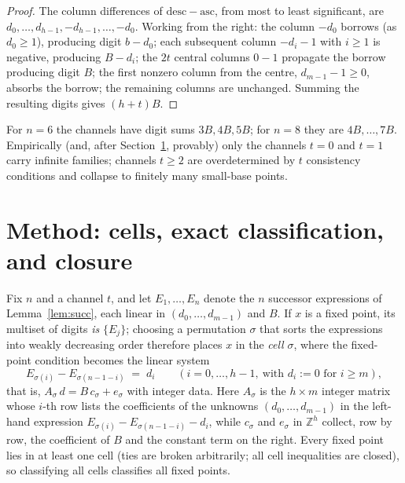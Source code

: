 \documentclass[11pt]{amsart}
\theoremstyle{definition}
\begin{document}
\begin{proof}
The column differences of $\mathrm{desc}-\mathrm{asc}$, from most to
least significant, are $d_0,\dots,d_{h-1},-d_{h-1},\dots,-d_0$. Working
from the right: the column $-d_0$ borrows (as $d_0\ge 1$), producing
digit $b-d_0$; each subsequent column $-d_i-1$ with $i\ge1$ is negative,
producing $B-d_i$; the $2t$ central columns $0-1$ propagate the borrow
producing digit $B$; the first nonzero column from the centre,
$d_{m-1}-1\ge 0$, absorbs the borrow; the remaining columns are
unchanged. Summing the resulting digits gives $(h+t)B$.
\end{proof}

For $n=6$ the channels have digit sums $3B,4B,5B$; for $n=8$ they are
$4B,\dots,7B$. Empirically (and, after Section~\ref{sec:method},
provably) only the channels $t=0$ and $t=1$ carry infinite families;
channels $t\ge 2$ are overdetermined by $t$ consistency conditions and
collapse to finitely many small-base points.

\section{Method: cells, exact classification, and closure}\label{sec:method}

Fix $n$ and a channel $t$, and let $E_1,\dots,E_n$ denote the $n$
successor expressions of Lemma~\ref{lem:succ}, each linear in
$(d_0,\dots,d_{m-1})$ and $B$. If $x$ is a fixed point, its multiset of
digits \emph{is} $\{E_j\}$; choosing a permutation $\sigma$ that sorts
the expressions into weakly decreasing order therefore places $x$ in the
\emph{cell} $\sigma$, where the fixed-point condition becomes the linear
system
\[
E_{\sigma(i)}-E_{\sigma(n-1-i)}\;=\;d_i \qquad (i=0,\dots,h-1,
\ \text{with } d_i:=0 \text{ for } i\ge m),
\]
that is, $A_\sigma\,d = B\,c_\sigma + e_\sigma$ with integer data. Here
$A_\sigma$ is the $h\times m$ integer matrix whose $i$-th row lists the
coefficients of the unknowns $(d_0,\dots,d_{m-1})$ in the left-hand
expression $E_{\sigma(i)}-E_{\sigma(n-1-i)}-d_i$, while $c_\sigma$ and
$e_\sigma$ in $\mathbb{Z}^h$ collect, row by row, the coefficient of $B$
and the constant term on the right. Every fixed point lies in at least
one cell (ties are broken arbitrarily; all cell inequalities are
closed), so classifying all cells classifies all fixed points.
\end{document}
